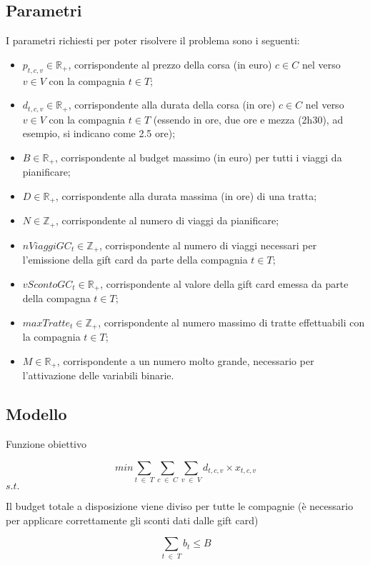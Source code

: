 \documentclass[main.tex]{subfiles}
\begin{document}
\subsection*{Parametri}
I parametri richiesti per poter risolvere il problema sono i seguenti:
\begin{itemize}
    \item $p_{t,c,v} \in \mathbb{R}_+$, corrispondente al prezzo della corsa (in euro) $c \in C$ nel verso $v \in V$ con la compagnia $t \in T$;
    \item $d_{t,c,v} \in \mathbb{R}_+$, corrispondente alla durata della corsa (in ore) $c \in C$ nel verso $v \in V$ con la compagnia $t \in T$ (essendo in ore, due ore e mezza (2h30), ad esempio, si indicano come 2.5 ore);
    \item $B \in \mathbb{R}_+$, corrispondente al budget massimo (in euro) per tutti i viaggi da pianificare;
    \item $D \in \mathbb{R}_+$, corrispondente alla durata massima (in ore) di una tratta;
    \item $N \in \mathbb{Z}_+$, corrispondente al numero di viaggi da pianificare;
    \item $nViaggiGC_t \in \mathbb{Z}_+$, corrispondente al numero di viaggi necessari per l'emissione della gift card da parte della compagnia $t \in T$;
    \item $vScontoGC_t \in \mathbb{R}_+$, corrispondente al valore della gift card emessa da parte della compagna $t \in T$;
    \item $maxTratte_t \in \mathbb{Z}_+$, corrispondente al numero massimo di tratte effettuabili con la compagnia $t \in T$;
    \item $M \in \mathbb{R}_+$, corrispondente a un numero molto grande, necessario per l'attivazione delle variabili binarie.
\end{itemize}

\subsection*{Modello}
\setlength{\parindent}{0em}
Funzione obiettivo
\begin{tcolorbox}
$$min \sum_{t\; \in\; T} \sum_{c\; \in\; C} \sum_{v\; \in\; V} d_{t,c,v} \times{} x_{t,c,v}$$
$s.t.$
\end{tcolorbox}

Il budget totale a disposizione viene diviso per tutte le compagnie (è necessario per applicare correttamente gli sconti dati dalle gift card)
\begin{tcolorbox}
$$\sum_{t\; \in\; T} b_t \leq B$$
\end{tcolorbox}
\end{document}
